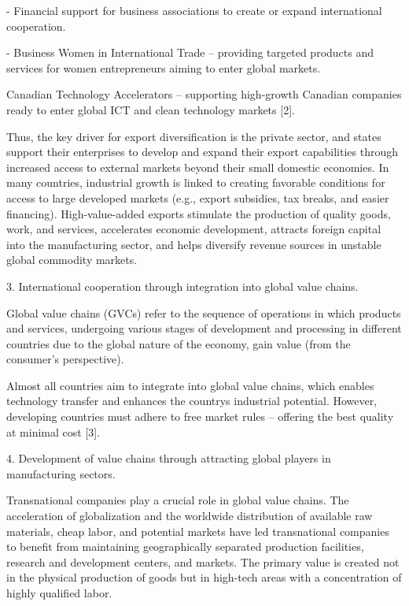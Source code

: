 \begin{multicols}{2}
- Financial support for business associations to create or expand
international cooperation.

- Business Women in International Trade -- providing targeted products
and services for women entrepreneurs aiming to enter global markets.

Canadian Technology Accelerators -- supporting high-growth Canadian
companies ready to enter global ICT and clean technology markets
{[}2{]}.

Thus, the key driver for export diversification is the private sector,
and states support their enterprises to develop and expand their export
capabilities through increased access to external markets beyond their
small domestic economies. In many countries, industrial growth is linked
to creating favorable conditions for access to large developed markets
(e.g., export subsidies, tax breaks, and easier financing).
High-value-added exports stimulate the production of quality goods,
work, and services, accelerates economic development, attracts foreign
capital into the manufacturing sector, and helps diversify revenue
sources in unstable global commodity markets.

3. International cooperation through integration into global value
chains.

Global value chains (GVCs) refer to the sequence of operations in which
products and services, undergoing various stages of development and
processing in different countries due to the global nature of the
economy, gain value (from the consumer's perspective).

Almost all countries aim to integrate into global value chains, which
enables technology transfer and enhances the country\textquotesingle s
industrial potential. However, developing countries must adhere to free
market rules -- offering the best quality at minimal cost {[}3{]}.

4. Development of value chains through attracting global players in
manufacturing sectors.

Transnational companies play a crucial role in global value chains. The
acceleration of globalization and the worldwide distribution of
available raw materials, cheap labor, and potential markets have led
transnational companies to benefit from maintaining geographically
separated production facilities, research and development centers, and
markets. The primary value is created not in the physical production of
goods but in high-tech areas with a concentration of highly qualified
labor.


\end{multicols}
